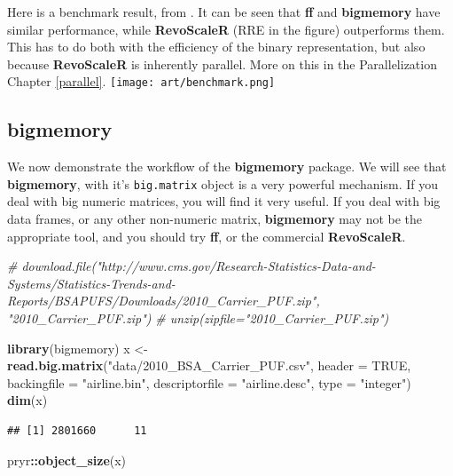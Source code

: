 \documentclass[]{book}
\newenvironment{Shaded}{\begin{snugshade}}{\end{snugshade}}
\newcommand{\KeywordTok}[1]{\textcolor[rgb]{0.13,0.29,0.53}{\textbf{#1}}}
\newcommand{\DataTypeTok}[1]{\textcolor[rgb]{0.13,0.29,0.53}{#1}}
\newcommand{\StringTok}[1]{\textcolor[rgb]{0.31,0.60,0.02}{#1}}
\newcommand{\CommentTok}[1]{\textcolor[rgb]{0.56,0.35,0.01}{\textit{#1}}}
\newcommand{\OtherTok}[1]{\textcolor[rgb]{0.56,0.35,0.01}{#1}}
\newcommand{\OperatorTok}[1]{\textcolor[rgb]{0.81,0.36,0.00}{\textbf{#1}}}
\newcommand{\NormalTok}[1]{#1}
\theoremstyle{definition}
\theoremstyle{definition}
\theoremstyle{definition}
\theoremstyle{remark}
\begin{document}
Here is a benchmark result, from \citet{wang2015statistical}. It can be
seen that \textbf{ff} and \textbf{bigmemory} have similar performance,
while \textbf{RevoScaleR} (RRE in the figure) outperforms them. This has
to do both with the efficiency of the binary representation, but also
because \textbf{RevoScaleR} is inherently parallel. More on this in the
Parallelization Chapter \ref{parallel}.
\texttt{[image: art/benchmark.png]}

\subsection{bigmemory}\label{bigmemory}

We now demonstrate the workflow of the \textbf{bigmemory} package. We
will see that \textbf{bigmemory}, with it's \texttt{big.matrix} object
is a very powerful mechanism. If you deal with big numeric matrices, you
will find it very useful. If you deal with big data frames, or any other
non-numeric matrix, \textbf{bigmemory} may not be the appropriate tool,
and you should try \textbf{ff}, or the commercial \textbf{RevoScaleR}.

\begin{Shaded}
\begin{Highlighting}[]
\CommentTok{# download.file("http://www.cms.gov/Research-Statistics-Data-and-Systems/Statistics-Trends-and-Reports/BSAPUFS/Downloads/2010_Carrier_PUF.zip", "2010_Carrier_PUF.zip")}
\CommentTok{# unzip(zipfile="2010_Carrier_PUF.zip")}

\KeywordTok{library}\NormalTok{(bigmemory)}
\NormalTok{x <-}\StringTok{ }\KeywordTok{read.big.matrix}\NormalTok{(}\StringTok{"data/2010_BSA_Carrier_PUF.csv"}\NormalTok{, }\DataTypeTok{header =} \OtherTok{TRUE}\NormalTok{, }
                     \DataTypeTok{backingfile =} \StringTok{"airline.bin"}\NormalTok{, }
                     \DataTypeTok{descriptorfile =} \StringTok{"airline.desc"}\NormalTok{, }
                     \DataTypeTok{type =} \StringTok{"integer"}\NormalTok{)}
\KeywordTok{dim}\NormalTok{(x)}
\end{Highlighting}
\end{Shaded}

\begin{verbatim}
## [1] 2801660      11
\end{verbatim}

\begin{Shaded}
\begin{Highlighting}[]
\NormalTok{pryr}\OperatorTok{::}\KeywordTok{object_size}\NormalTok{(x)}
\end{Highlighting}
\end{Shaded}
\end{document}
